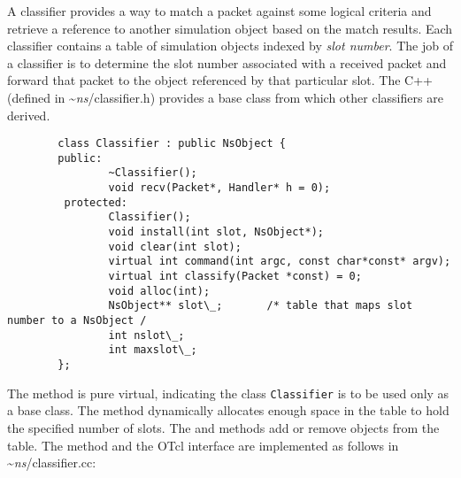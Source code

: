 A classifier provides a way to match a packet against some
logical criteria and retrieve a reference to another simulation
object based on the match results.
Each classifier contains a table of simulation objects indexed
by {\em slot number}.
The job of a classifier is to determine the slot number associated
with a received packet and forward that packet to the
object referenced by that particular slot.
The C++ 
(defined in \textasciitilde\emph{ns}/{classifier.h})
provides a base class from which other classifiers are derived.
\begin{verbatim}
        class Classifier : public NsObject {
        public:
                ~Classifier();
                void recv(Packet*, Handler* h = 0);
         protected:
                Classifier();
                void install(int slot, NsObject*);
                void clear(int slot);
                virtual int command(int argc, const char*const* argv);
                virtual int classify(Packet *const) = 0;
                void alloc(int);
                NsObject** slot\_;       /* table that maps slot number to a NsObject /
                int nslot\_;
                int maxslot\_;
        };
\end{verbatim}
The  method is pure virtual, indicating the
class {\tt Classifier} is to be used only as a base class.
The  method dynamically allocates enough space
in the table to hold the specified number of slots.
The  and  methods
add or remove objects from the table.
The  method and the OTcl interface are implemented
as follows in \textasciitilde\emph{ns}/{classifier.cc}:
